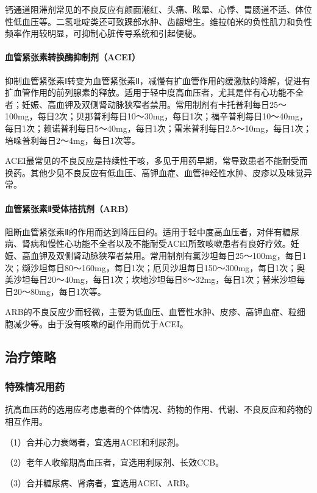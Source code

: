 钙通道阻滞剂常见的不良反应有颜面潮红、头痛、眩晕、心悸、胃肠道不适、体位性低血压等。二氢吡啶类还可致踝部水肿、齿龈增生。维拉帕米的负性肌力和负性频率作用较明显，可抑制心脏传导系统和引起便秘。
\paragraph{血管紧张素转换酶抑制剂（ACEI）}

抑制血管紧张素Ⅰ转变为血管紧张素Ⅱ，减慢有扩血管作用的缓激肽的降解，促进有扩血管作用的前列腺素的释放。适用于轻中度高血压者，尤其是伴有心功能不全者；妊娠、高血钾及双侧肾动脉狭窄者禁用。常用制剂有卡托普利每日25～100mg，每日2次；贝那普利每日10～30mg，每日1次；福辛普利每日10～40mg，每日1次；赖诺普利每日5～40mg，每日1次；雷米普利每日2.5～10mg，每日1次；培哚普利每日2～4mg，每日1次等。

ACEI最常见的不良反应是持续性干咳，多见于用药早期，常导致患者不能耐受而换药。其他少见不良反应有低血压、高钾血症、血管神经性水肿、皮疹以及味觉异常。
\paragraph{血管紧张素Ⅱ受体拮抗剂（ARB）}

阻断血管紧张素Ⅱ的作用而达到降压目的。适用于轻中度高血压者，对伴有糖尿病、肾病和慢性心功能不全者以及不能耐受ACEI所致咳嗽患者有良好疗效。妊娠、高血钾及双侧肾动脉狭窄者禁用。常用制剂有氯沙坦每日25～100mg，每日1次；缬沙坦每日80～160mg，每日1次；厄贝沙坦每日150～300mg，每日1次；奥美沙坦每日20～40mg，每日1次；坎地沙坦每日8～32mg，每日1次；替米沙坦每日20～80mg，每日1次等。

ARB的不良反应少而轻微，主要为低血压、血管性水肿、皮疹、高钾血症、粒细胞减少等。由于没有咳嗽的副作用而优于ACEI。

\subsection{治疗策略}

\subsubsection{特殊情况用药}

抗高血压药的选用应考虑患者的个体情况、药物的作用、代谢、不良反应和药物的相互作用。

（1）合并心力衰竭者，宜选用ACEI和利尿剂。

（2）老年人收缩期高血压者，宜选用利尿剂、长效CCB。

（3）合并糖尿病、肾病者，宜选用ACEI、ARB。

